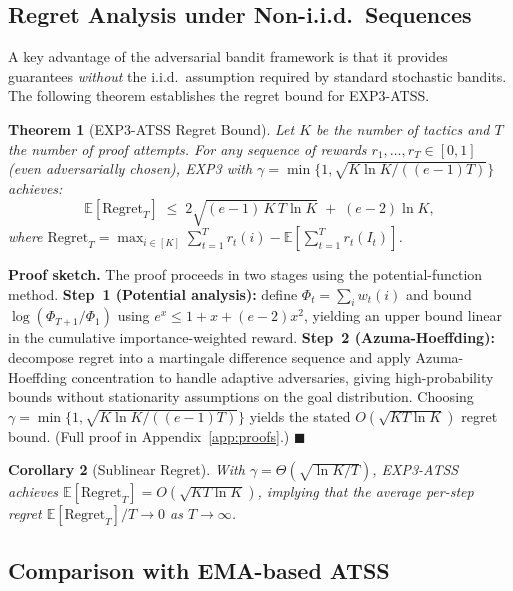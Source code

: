 \documentclass[conference]{IEEEtran}
\newtheorem{theorem}{Theorem}[section]
\newtheorem{corollary}[theorem]{Corollary}
\newenvironment{proof}[1][Proof]{\textbf{#1.} }{\hfill$\blacksquare$}
\begin{document}
\subsection{Regret Analysis under Non-i.i.d.\ Sequences}

A key advantage of the adversarial bandit framework is that it
provides guarantees \emph{without} the i.i.d.\ assumption required by
standard stochastic bandits.  The following theorem establishes the
regret bound for EXP3-ATSS.

\begin{theorem}[EXP3-ATSS Regret Bound]
  \label{thm:atss-regret}
  Let $K$ be the number of tactics and $T$ the number of proof
  attempts.  For any sequence of rewards $r_1,\dots,r_T \in [0,1]$
  (even adversarially chosen), EXP3 with $\gamma = \min\{1,
  \sqrt{K\ln K / ((e-1)T)}\}$ achieves:
  \begin{equation}
    \mathbb{E}[\mathrm{Regret}_T] \;\leq\;
    2\sqrt{(e-1)\,K\,T\ln K} \;+\; (e-2)\ln K,
  \end{equation}
  where $\mathrm{Regret}_T = \max_{i\in[K]} \sum_{t=1}^{T} r_t(i) -
  \mathbb{E}[\sum_{t=1}^{T} r_t(I_t)]$.
\end{theorem}

\begin{proof}[Proof sketch]
  The proof proceeds in two stages using the potential-function method.
  \textbf{Step~1 (Potential analysis):} define
  $\Phi_t = \sum_i w_t(i)$ and bound $\log(\Phi_{T+1}/\Phi_1)$ using
  $e^x \le 1 + x + (e-2)x^2$, yielding an upper bound linear in the
  cumulative importance-weighted reward.  \textbf{Step~2
  (Azuma-Hoeffding):} decompose regret into a martingale difference
  sequence and apply Azuma-Hoeffding concentration to handle adaptive
  adversaries, giving high-probability bounds without stationarity
  assumptions on the goal distribution.  Choosing
  $\gamma = \min\{1,\sqrt{K\ln K/((e-1)T)}\}$ yields the stated
  $O(\sqrt{KT\ln K})$ regret bound.
  (Full proof in Appendix~\ref{app:proofs}.)
\end{proof}

\begin{corollary}[Sublinear Regret]
  With $\gamma = \Theta(\sqrt{\ln K / T})$, EXP3-ATSS achieves
  $\mathbb{E}[\mathrm{Regret}_T] = O(\sqrt{KT\ln K})$, implying
  that the average per-step regret
  $\mathbb{E}[\mathrm{Regret}_T]/T \to 0$ as $T \to \infty$.
\end{corollary}

\subsection{Comparison with EMA-based ATSS}
\end{document}
